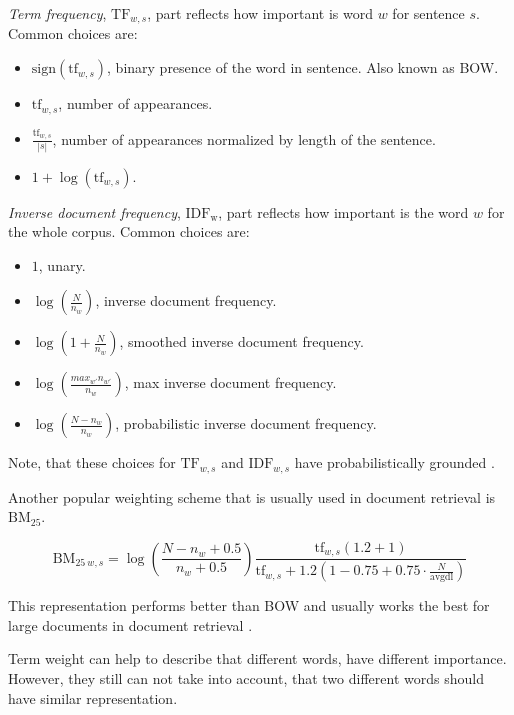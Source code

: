         \emph{Term frequency}, $\mathrm{TF}_{w,s}$, part reflects how important is word $w$ for sentence $s$.
        Common choices are:
        \begin{itemize}
            \item $\mathrm{sign}(\mathrm{tf}_{w,s})$, binary presence of the word in sentence. Also known as BOW.
            \item $\mathrm{tf}_{w,s}$, number of appearances.
            \item $\frac{\mathrm{tf}_{w,s}}{|s|}$, number of appearances normalized by length of the sentence.
            \item $1+\log(\mathrm{tf}_{w,s})$.
        \end{itemize}
        
        \emph{Inverse document frequency}, $\mathrm{IDF_w}$, part reflects how important is the word $w$ for the whole corpus.
        Common choices are:
        \begin{itemize}
            \item $1$, unary.
            \item $\log \left(\frac{N}{n_w} \right)$, inverse document frequency.
            \item $\log \left( 1+\frac{N}{n_w} \right)$, smoothed inverse document frequency.
            \item $\log \left( \frac{max_{w'} n_{w'}}{n_w} \right)$, max inverse document frequency.
            \item $\log \left(\frac{N-n_w}{n_w} \right)$, probabilistic inverse document frequency.
        \end{itemize}

        Note, that these choices for $\mathrm{TF}_{w,s}$ and $\mathrm{IDF}_{w,s}$ have probabilistically grounded \cite{aizawa2003information}. %
        
        Another popular weighting scheme that is usually used in document retrieval is $\mathrm{BM_{25}}$. 
        
        $$\mathrm{BM}_{25~w,s} = \log \left(\frac{N-n_w+0.5}{n_w + 0.5}\right)    \frac{\mathrm{tf}_{w,s} (1.2 + 1)}{\mathrm{tf}_{w,s} + 1.2  \left(1 - 0.75 + 0.75 \cdot \frac{N}{\text{avgdl}}\right)}$$
        
        This representation performs better than BOW and usually works the best for large documents in document retrieval \cite{li2014semantic}.
        
        Term weight can help to describe that different words, have different importance.
        However, they still can not take into account, that two different words should have similar representation.
        
